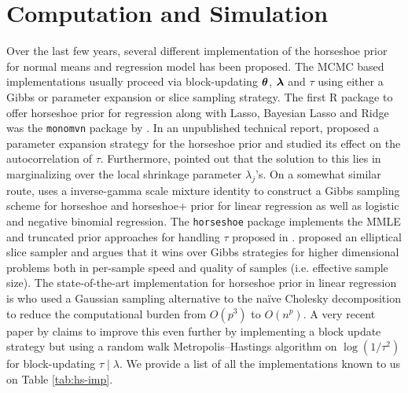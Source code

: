 \documentclass[11pt]{article}
\begin{document}
%


\section{Computation and Simulation}\label{sec:horse-comp}

Over the last few years, several different implementation of the horseshoe prior for normal means and regression model has been proposed. The MCMC based implementations usually proceed via block-updating $\boldsymbol{\theta}$, $\boldsymbol{\lambda}$ and $\tau$ using either a Gibbs or parameter expansion or slice sampling strategy. The first \textsc{R} package to offer horseshoe prior for regression along with Lasso, Bayesian Lasso and Ridge was the \texttt{monomvn} package by \citet{gramacy2010shrinkage}. In an unpublished technical report, \citet{scott_parameter_2010} proposed a parameter expansion strategy for the horseshoe prior and studied its effect on the autocorrelation of $\tau$. Furthermore, \citet{scott_parameter_2010} pointed out that the solution to this lies in marginalizing over the local shrinkage parameter $\lambda_j$'s. On a somewhat similar route, \citet{makalic2016high} uses a inverse-gamma scale mixture identity to construct a Gibbs sampling scheme for horseshoe and horseshoe+ prior for linear regression as well as logistic and negative binomial regression. The \texttt{horseshoe} package implements the MMLE and truncated prior approaches for handling $\tau$ proposed in \citet{van2017adaptive}. \citet{hahn_elliptical_2016} proposed an elliptical slice sampler and argues that it wins over Gibbs strategies for higher dimensional problems both in per-sample speed and quality of samples (i.e. effective sample size). The state-of-the-art implementation for horseshoe prior in linear regression is \citet{bhattacharya_fast_2015} who used a Gaussian sampling alternative to the na\"ive Cholesky decomposition to reduce the computational burden from $O(p^3)$ to $O(n^p)$. A very recent paper by \citet{james2017scalable} claims to improve this even further by implementing a block update strategy but using a random walk Metropolis--Hastings algorithm on $\log(1/\tau^2)$ for block-updating $\tau \mid \lambda$. We provide a list of all the implementations known to us on Table \ref{tab:hs-imp}.
\end{document}
